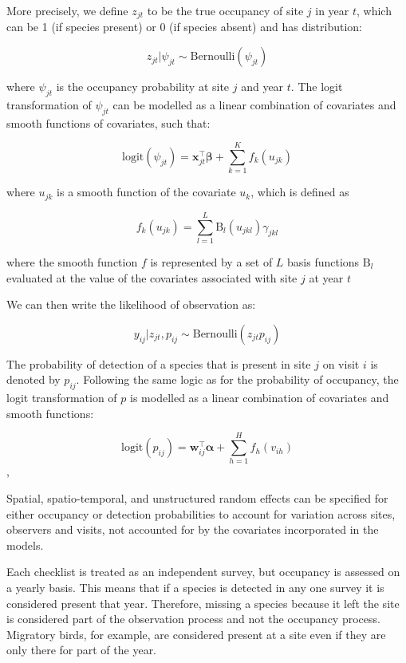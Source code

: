 \documentclass[utf8]{frontiersSCNS}
\begin{document}
More precisely, we define \(z_{jt}\) to be the true occupancy of site
\(j\) in year \(t\), which can be 1 (if species present) or 0 (if
species absent) and has distribution:

\[z_{jt}|\psi_{jt} \sim \textrm{Bernoulli}(\psi_{jt})\]

where \(\psi_{jt}\) is the occupancy probability at site \(j\) and year
\(t\). The logit transformation of \(\psi_{jt}\) can be modelled as a
linear combination of covariates and smooth functions of covariates,
such that:

\[\textrm{logit}(\psi_{jt}) = \boldsymbol{x}_{jt}^\intercal \boldsymbol{\beta} + \sum_{k=1}^K f_k(u_{jk})\]

where \(u_{jk}\) is a smooth function of the covariate \(u_k\), which is
defined as

\[f_k(u_{jk}) = \sum_{l=1}^L \textrm{B}_l(u_{jkl})\gamma_{jkl}\]

where the smooth function \(f\) is represented by a set of \(L\) basis
functions \(\textrm{B}_l\) evaluated at the value of the covariates
associated with site \(j\) at year \(t\)

We can then write the likelihood of observation as:

\[y_{ij}|z_{jt},p_{ij} \sim \textrm{Bernoulli}(z_{jt}p_{ij})\]

The probability of detection of a species that is present in site \(j\)
on visit \(i\) is denoted by \(p_{ij}\). Following the same logic as for
the probability of occupancy, the logit transformation of \(p\) is
modelled as a linear combination of covariates and smooth functions:

\[\textrm{logit}(p_{ij})= \boldsymbol{w}_{ij}^\intercal \boldsymbol{\alpha} + \sum_{h=1}^H f_h(v_{ih})\],

Spatial, spatio-temporal, and unstructured random effects can be
specified for either occupancy or detection probabilities to account for
variation across sites, observers and visits, not accounted for by the
covariates incorporated in the models.

Each checklist is treated as an independent survey, but occupancy is
assessed on a yearly basis. This means that if a species is detected in
any one survey it is considered present that year. Therefore, missing a
species because it left the site is considered part of the observation
process and not the occupancy process. Migratory birds, for example, are
considered present at a site even if they are only there for part of the
year.
\end{document}
